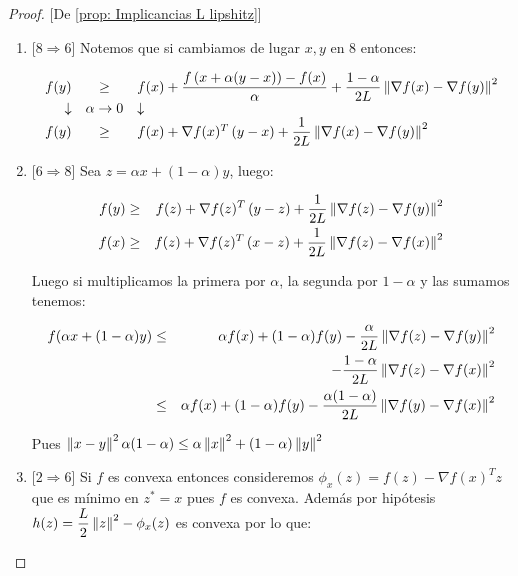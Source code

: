 \begin{proof}{[De \ref{prop: Implicancias L lipshitz}]}
\begin{enumerate}
		\item {[$8 \Longrightarrow 6$]} Notemos que si cambiamos de lugar $x,y$ en $8$ entonces:
		
		
		\begin{equation*}
		\begin{array}{rcl}
			f(y) & \geq & f(x) + \dfrac{f\left(x + \alpha (y-x)\right) -f(x)}{\alpha} + \dfrac{1-\alpha}{2L}\left\lVert\nabla f(x) - \nabla f(y)\right\rVert^2 \\
			\downarrow & \alpha \rightarrow 0 & \downarrow \\
			f(y) & \geq & f(x) + \nabla f(x)^T \left(y-x\right) +  \dfrac{1}{2L}\left\lVert\nabla f(x) - \nabla f(y)\right\rVert^2 
		\end{array}
		\end{equation*} 
		
		\item {[$6 \Longrightarrow 8$]} Sea $z = \alpha x + (1-\alpha)y$, luego:
		
		\begin{equation*}
		\begin{aligned}
		f(y) & \geq & f(z) + \nabla f(z)^T \left(y-z\right) +  \dfrac{1}{2L}\left\lVert\nabla f(z) - \nabla f(y)\right\rVert^2  \\
		f(x) & \geq & f(z) + \nabla f(z)^T \left(x-z\right) +  \dfrac{1}{2L}\left\lVert\nabla f(z) - \nabla f(x)\right\rVert^2 
		\end{aligned}
		\end{equation*}
		
		Luego si multiplicamos la primera por $\alpha$, la segunda por $1-\alpha$ y las sumamos tenemos:
		
		\begin{equation*}
			\begin{aligned}
				f(\alpha x + (1-\alpha)y) & \leq & \alpha f(x) + (1-\alpha)f(y) - \dfrac{\alpha}{2L}\left\lVert\nabla f(z) - \nabla f(y)\right\rVert^2 \\ & & - \dfrac{1-\alpha}{2L}\left\lVert\nabla f(z) - \nabla f(x)\right\rVert^2 \\
				& \leq & \alpha f(x) + (1-\alpha)f(y) - \dfrac{\alpha (1-\alpha)}{2L}\left\lVert\nabla f(y) - \nabla f(x)\right\rVert^2
			\end{aligned}
		\end{equation*}
		
		Pues $\left\lVert x-y\right\rVert^2\alpha (1-\alpha) \leq \alpha \left\lVert x\right\rVert^2 + (1-\alpha)\left\lVert y\right\rVert^2$
		
			\item {[$2 \Longrightarrow 6$]} Si $f$ es convexa entonces consideremos $\phi_x(z) = f(z) - \nabla f(x)^T z$ que es m\'inimo en $z^* = x$ pues $f$ es convexa. Adem\'as por hip\'otesis $h(z) = \dfrac{L}{2} \left\lVert z\right\rVert^2 - \phi_x(z)$ es convexa por lo que:
		

\end{enumerate}
\end{proof}
